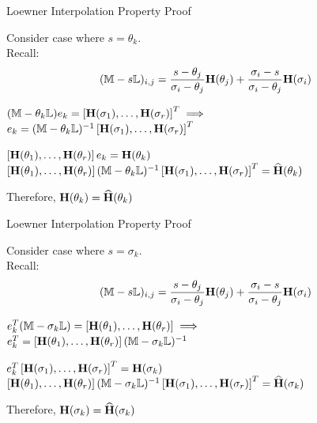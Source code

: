 \begin{frame}{Loewner Interpolation Property Proof}

Consider case where $s = \theta_k$.\\
\bigskip
Recall:
$$(\mathbb{M} - s \mathbb{L})_{i,j} = \frac{s - \theta_j}{\sigma_i - \theta_j}{\bf H}(\theta_j) + \frac{\sigma_i - s}{\sigma_i - \theta_j}{\bf H}(\sigma_i)$$

\begin{center}
$(\mathbb{M} - \theta_k \mathbb{L})e_k = \left[{\bf H}(\sigma_1), \dots, {\bf H}(\sigma_r) \right]^T \implies$ \\
$e_k = (\mathbb{M} - \theta_k \mathbb{L})^{-1}\left[{\bf H}(\sigma_1), \dots, {\bf H}(\sigma_r) \right]^T$
\end{center}

\begin{center}
$\left[{\bf H}(\theta_1), \dots, {\bf H}(\theta_r) \right] e_k = {\bf H}(\theta_k)$\\

$\left[{\bf H}(\theta_1), \dots, {\bf H}(\theta_r) \right] (\mathbb{M} - \theta_k \mathbb{L})^{-1}\left[{\bf H}(\sigma_1), \dots, {\bf H}(\sigma_r) \right]^T = {\bf \widehat H}(\theta_k)$
\end{center}

Therefore, ${\bf H}(\theta_k) = {\bf \widehat H}(\theta_k)$

\end{frame}
\begin{frame}{Loewner Interpolation Property Proof}

Consider case where $s = \sigma_k$.\\
\bigskip
Recall:
$$(\mathbb{M} - s \mathbb{L})_{i,j} = \frac{s - \theta_j}{\sigma_i - \theta_j}{\bf H}(\theta_j) + \frac{\sigma_i - s}{\sigma_i - \theta_j}{\bf H}(\sigma_i)$$


\begin{center}
$e_k^T(\mathbb{M} - \sigma_k \mathbb{L}) = \left[{\bf H}(\theta_1), \dots, {\bf H}(\theta_r) \right] \implies$ \\
$e_k^T = \left[{\bf H}(\theta_1), \dots, {\bf H}(\theta_r) \right] (\mathbb{M} - \sigma_k \mathbb{L})^{-1}$
\end{center}

\begin{center}
$e_k^T \left[{\bf H}(\sigma_1), \dots, {\bf H}(\sigma_r) \right]^T = {\bf H}(\sigma_k)$\\

$\left[{\bf H}(\theta_1), \dots, {\bf H}(\theta_r) \right] (\mathbb{M} - \sigma_k \mathbb{L})^{-1}\left[{\bf H}(\sigma_1), \dots, {\bf H}(\sigma_r) \right]^T = {\bf \widehat H}(\sigma_k)$
\end{center}

Therefore, ${\bf H}(\sigma_k) = {\bf \widehat H}(\sigma_k)$

\end{frame}

